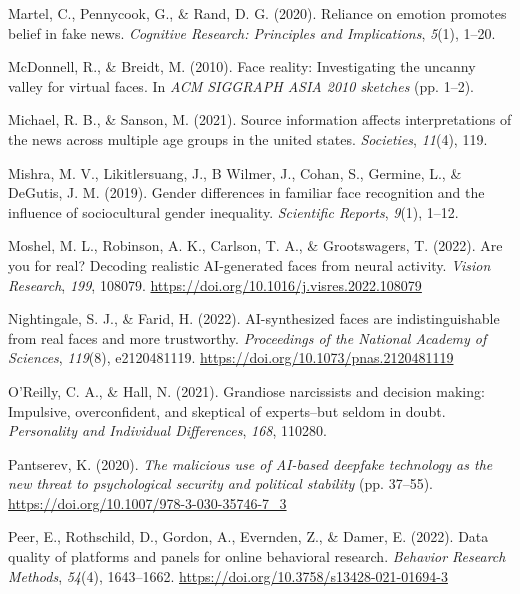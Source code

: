 \documentclass[
  man,floatsintext]{apa6}
\newlength{\cslhangindent}
\newlength{\cslentryspacingunit} %
\newenvironment{CSLReferences}[2] %
 {%
  \setlength{\parindent}{0pt}
  \ifodd #1
  \let\oldpar\par
  \def\par{\hangindent=\cslhangindent\oldpar}
  \fi
  \setlength{\parskip}{#2\cslentryspacingunit}
 }%
 {}
\begin{document}
\begin{CSLReferences}{1}{0}
\leavevmode{}%
Martel, C., Pennycook, G., \& Rand, D. G. (2020). Reliance on emotion promotes belief in fake news. \emph{Cognitive Research: Principles and Implications}, \emph{5}(1), 1--20.

\leavevmode{}%
McDonnell, R., \& Breidt, M. (2010). Face reality: Investigating the uncanny valley for virtual faces. In \emph{ACM SIGGRAPH ASIA 2010 sketches} (pp. 1--2).

\leavevmode{}%
Michael, R. B., \& Sanson, M. (2021). Source information affects interpretations of the news across multiple age groups in the united states. \emph{Societies}, \emph{11}(4), 119.

\leavevmode{}%
Mishra, M. V., Likitlersuang, J., B Wilmer, J., Cohan, S., Germine, L., \& DeGutis, J. M. (2019). Gender differences in familiar face recognition and the influence of sociocultural gender inequality. \emph{Scientific Reports}, \emph{9}(1), 1--12.

\leavevmode{}%
Moshel, M. L., Robinson, A. K., Carlson, T. A., \& Grootswagers, T. (2022). Are you for real? Decoding realistic AI-generated faces from neural activity. \emph{Vision Research}, \emph{199}, 108079. \url{https://doi.org/10.1016/j.visres.2022.108079}

\leavevmode{}%
Nightingale, S. J., \& Farid, H. (2022). AI-synthesized faces are indistinguishable from real faces and more trustworthy. \emph{Proceedings of the National Academy of Sciences}, \emph{119}(8), e2120481119. \url{https://doi.org/10.1073/pnas.2120481119}

\leavevmode{}%
O'Reilly, C. A., \& Hall, N. (2021). Grandiose narcissists and decision making: Impulsive, overconfident, and skeptical of experts--but seldom in doubt. \emph{Personality and Individual Differences}, \emph{168}, 110280.

\leavevmode{}%
Pantserev, K. (2020). \emph{The malicious use of AI-based deepfake technology as the new threat to psychological security and political stability} (pp. 37--55). \url{https://doi.org/10.1007/978-3-030-35746-7_3}

\leavevmode{}%
Peer, E., Rothschild, D., Gordon, A., Evernden, Z., \& Damer, E. (2022). Data quality of platforms and panels for online behavioral research. \emph{Behavior Research Methods}, \emph{54}(4), 1643--1662. \url{https://doi.org/10.3758/s13428-021-01694-3}


\end{CSLReferences}
\end{document}
